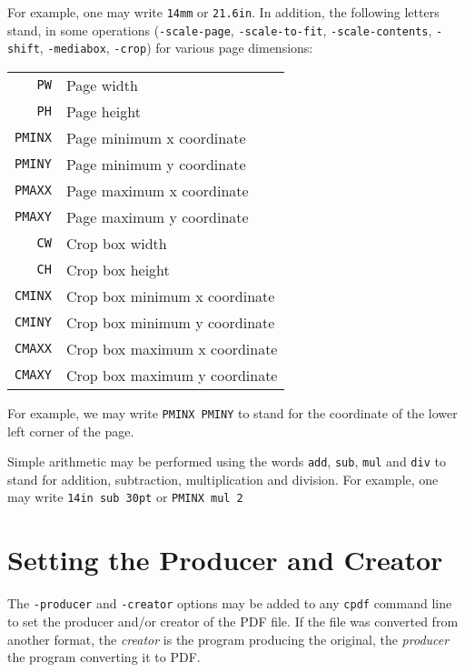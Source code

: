 \documentclass{book}
\begin{document}
\noindent For example, one may write \texttt{14mm} or \texttt{21.6in}. In addition, the following letters stand, in some operations (\texttt{-scale-page}, \texttt{-scale-to-fit}, \texttt{-scale-contents}, \texttt{-shift}, \texttt{-mediabox}, \texttt{-crop}) for various page dimensions:

\begin{table}[h]
\centering
\begin{tabular}{rl}
  \texttt{PW} & Page width\\
  \texttt{PH} & Page height\\
  \texttt{PMINX} & Page minimum x coordinate\\
  \texttt{PMINY} & Page minimum y coordinate\\
  \texttt{PMAXX} & Page maximum x coordinate\\
  \texttt{PMAXY} & Page maximum y coordinate\\
  \texttt{CW} & Crop box width\\
  \texttt{CH} & Crop box height\\
  \texttt{CMINX} & Crop box minimum x coordinate\\
  \texttt{CMINY} & Crop box minimum y coordinate\\
  \texttt{CMAXX} & Crop box maximum x coordinate\\
  \texttt{CMAXY} & Crop box maximum y coordinate
\end{tabular}
\end{table}

\noindent For example, we may write \texttt{PMINX PMINY} to stand for the coordinate of the lower left corner of the page.

Simple arithmetic may be performed using the words \texttt{add}, \texttt{sub}, \texttt{mul} and \texttt{div} to stand for addition, subtraction, multiplication and division. For example, one may write \texttt{14in\hspace{-1mm} sub\hspace{-1mm} 30pt} or \texttt{PMINX\hspace{-1mm} mul\hspace{-1mm} 2}

\section{Setting the Producer and Creator}

The \texttt{-producer} and \texttt{-creator} options may be added to any \texttt{cpdf} command line to set the producer and/or creator of the PDF file. If the file was converted from another format, the \textit{creator} is the program producing the original, the \textit{producer} the program converting it to PDF.
\end{document}
